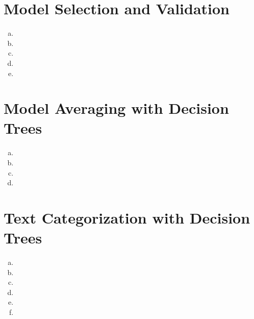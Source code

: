 \documentclass{article}
\begin{document}
\thispagestyle{fancy}

\section{Model Selection and Validation}

\begin{enumerate}[(a)]
\item 
\item 
\item 
\item
\item 
\end{enumerate}

\section{Model Averaging with Decision Trees}

\begin{enumerate}[(a)]
\item 
\item 
\item 
\item
\end{enumerate}

\section{Text Categorization with Decision Trees}

\begin{enumerate}[(a)]
\item 
\item 
\item 
\item
\item 
\item 
\end{enumerate}
\end{document}
